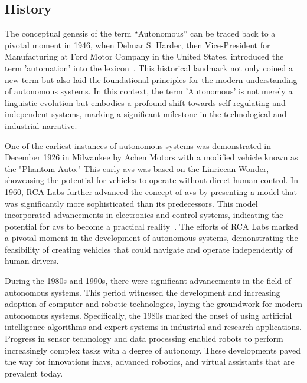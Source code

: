 \subsection{History}


The conceptual genesis of the term ``Autonomous'' can be traced back to a pivotal moment in 1946, when Delmar S. Harder, then Vice-President for Manufacturing at Ford Motor Company in the United States, introduced the term 'automation' into the lexicon~\cite{Hayes2015}. This historical landmark not only coined a new term but also laid the foundational principles for the modern understanding of autonomous systems. In this context, the term 'Autonomous' is not merely a linguistic evolution but embodies a profound shift towards self-regulating and independent systems, marking a significant milestone in the technological and industrial narrative. 

One of the earliest instances of autonomous systems was demonstrated in December 1926 in Milwaukee by Achen Motors with a modified vehicle known as the "Phantom Auto." This early \glspl{av} was based on the Linriccan Wonder, showcasing the potential for vehicles to operate without direct human control. In 1960, RCA Labs further advanced the concept of \glspl{av} by presenting a model that was significantly more sophisticated than its predecessors. This model incorporated advancements in electronics and control systems, indicating the potential for \glspl{av} to become a practical reality~\cite{bimbraw2015autonomous}. The efforts of RCA Labs marked a pivotal moment in the development of autonomous systems, demonstrating the feasibility of creating vehicles that could navigate and operate independently of human drivers.

During the 1980s and 1990s, there were significant advancements in the field of autonomous systems. This period witnessed the development and increasing adoption of computer and robotic technologies, laying the groundwork for modern autonomous systems. Specifically, the 1980s marked the onset of using artificial intelligence algorithms and expert systems in industrial and research applications. Progress in sensor technology and data processing enabled robots to perform increasingly complex tasks with a degree of autonomy. These developments paved the way for innovations in\glspl{av}, advanced robotics, and virtual assistants that are prevalent today.


